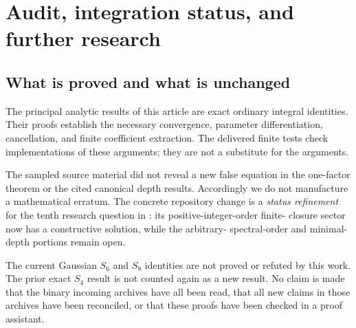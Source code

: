 \section{Audit, integration status, and further research}
\label{bmh:sec:audit}

\subsection{What is proved and what is unchanged}
The principal analytic results of this article are exact ordinary
integral identities. Their proofs establish the necessary convergence,
parameter differentiation, cancellation, and finite coefficient
extraction. The delivered finite tests check implementations of these
arguments; they are not a substitute for the arguments.

The sampled source material did not reveal a new false equation in the
one-factor theorem or the cited canonical depth results. Accordingly we
do not manufacture a mathematical erratum. The concrete repository
change is a \emph{status refinement} for the tenth research question in
: its positive-integer-order finite-
closure sector now has a constructive solution, while the arbitrary-
spectral-order and minimal-depth portions remain open.

The current Gaussian $S_6$ and $S_8$ identities are not proved or
refuted by this work. The prior exact $S_4$ result is not counted again
as a new result. No claim is made that the binary incoming archives have
all been read, that all new claims in those archives have been reconciled,
or that these proofs have been checked in a proof assistant.

